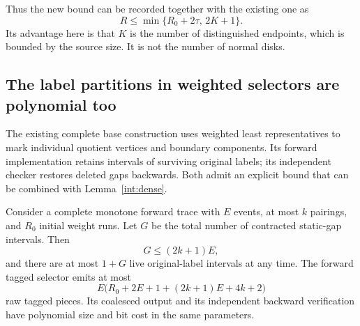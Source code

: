 Thus the new bound can be recorded together with the existing one as
\[
                 R\le\min\{R_0+2\tau,\,2K+1\}.
\]
Its advantage here is that $K$ is the number of distinguished endpoints,
which is bounded by the source size.  It is not the number of normal disks.

\subsection{The label partitions in weighted selectors are polynomial too}
\label{int:selectors}

The existing complete base construction uses weighted least representatives
to mark individual quotient vertices and boundary components.  Its forward
implementation retains intervals of surviving original labels; its
independent checker restores deleted gaps backwards.  Both admit an explicit
bound that can be combined with Lemma~\ref{int:dense}.

\begin{proposition}
\label{int:tagged}
Consider a complete monotone forward trace with $E$ events, at most $k$
pairings, and $R_0$ initial weight runs.  Let $G$ be the total number of
contracted static-gap intervals.  Then
\[
                 G\le(2k+1)E,
\]
and there are at most $1+G$ live original-label intervals at any time.
The forward tagged selector emits at most
\[
          E\bigl(R_0+2E+1+(2k+1)E+4k+2\bigr)
\]
raw tagged pieces.  Its coalesced output and its independent backward
verification have polynomial size and bit cost in the same parameters.
\end{proposition}

